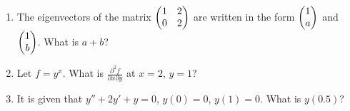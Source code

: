 \documentclass[journal,12pt,onecolumn]{IEEEtran}
\begin{document}
\begin{enumerate}[resume]
    \item The eigenvectors of the matrix $\begin{pmatrix}1 & 2 \\0 & 2\end{pmatrix}$ are written in the form $\begin{pmatrix}1 \\a\end{pmatrix}$ and $\begin{pmatrix}1 \\b\end{pmatrix}$. What is $a+b$?
          \begin{enumerate}
          \end{enumerate}

    \item Let $f = y^x$. What is $\frac{\partial^2 f}{\partial{x}\partial{y}}$ at $x=2$, $y=1$?
          \begin{enumerate}
          \end{enumerate}

    \item It is given that $y'' + 2y' + y=0$, $y(0)=0$, $y(1)=0$. What is $y(0.5)$?          \begin{enumerate}
          \end{enumerate}


\end{enumerate}
\end{document}
